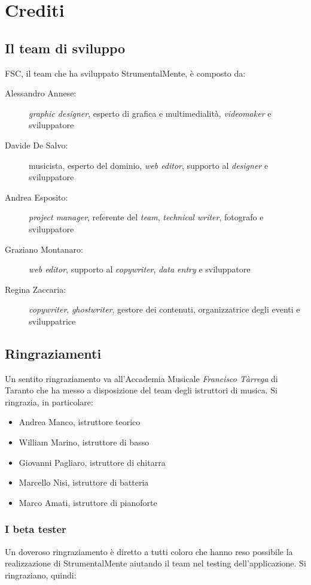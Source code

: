 \chapter{Crediti}
\section{Il team di sviluppo}

FSC, il team che ha sviluppato StrumentalMente, è composto da:
\begin{description}
    \item[Alessandro Annese:] \textit{graphic designer}, esperto di grafica e
    multimedialità, \textit{videomaker} e sviluppatore
    \item[Davide De Salvo:] musicista, esperto del dominio, \textit{web editor},
    supporto al \textit{designer} e sviluppatore
    \item[Andrea Esposito:] \textit{project manager}, referente del
    \textit{team}, \textit{technical writer}, fotografo e sviluppatore
    \item[Graziano Montanaro:] \textit{web editor}, supporto al
    \textit{copywriter}, \textit{data entry} e sviluppatore
    \item[Regina Zaccaria:] \textit{copywriter}, \textit{ghostwriter}, gestore
    dei contenuti, organizzatrice degli eventi e sviluppatrice
\end{description}

\section{Ringraziamenti}
Un sentito ringraziamento va all'Accademia Musicale \textit{Francisco Tàrrega}
di Taranto che ha messo a disposizione del team degli istruttori di musica. Si
ringrazia, in particolare:
\begin{itemize}
    \item Andrea Manco, istruttore teorico
    \item William Marino, istruttore di basso
    \item Giovanni Pagliaro, istruttore di chitarra
    \item Marcello Nisi, istruttore di batteria
    \item Marco Amati, istruttore di pianoforte
\end{itemize}
\subsection{I beta tester}
Un doveroso ringraziamento è diretto a tutti coloro che hanno reso possibile la
realizzazione di StrumentalMente aiutando il team nel testing dell'applicazione.
Si ringraziano, quindi: 